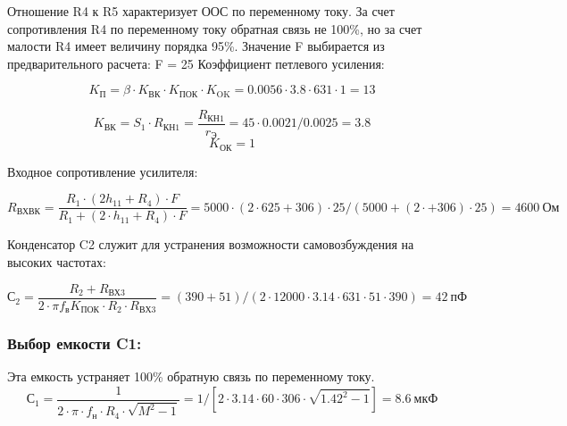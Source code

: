 Отношение R4  к R5 характеризует ООС по переменному току. За счет сопротивления R4 по переменному току обратная связь не 100\%, но за счет малости R4 имеет величину порядка 95\%.
Значение F выбирается из предварительного расчета: F = 25
Коэффициент петлевого усиления:

\begin{equation}
\label{eq:equation4_15}
K_{\text{П}}=\beta \cdot K_{\text{ВК}} \cdot K_{\text{ПОК}} \cdot K_{\text{OK}}=0.0056 \cdot 3.8 \cdot 631 \cdot 1 =13

\end{equation}

\begin{equation}
\label{eq:equation4_16}
K_{\text{ВК}}=S_1 \cdot R_{\text{КН1}}=\dfrac{R_{\text{КН1}}}{r_{\text{Э}}}=45 \cdot 0.0021/0.0025=3.8

\end{equation}
\begin{equation}
\label{eq:equation4_17}
K_{\text{ОК}}=1
\end{equation}

Входное сопротивление усилителя:

\begin{equation}
\label{eq:equation4_18}
R_{\text{ВХВК}}=\dfrac{R_1 \cdot (2 h_{11}+R_4) \cdot F}{R_1+(2 \cdot h_{11}+R_{\text{4}}) \cdot F} = 5000 \cdot(2 \cdot 625+306) \cdot 25 / (5000+(2 \cdot+306) \cdot 25)=4600~\text{Ом}
\end{equation}

Конденсатор C2 служит для устранения возможности самовозбуждения на высоких частотах:

\begin{equation}
\label{eq:equation4_19}
С_{\text{2}}=\dfrac{R_{\text{2}}+R_{\text{ВХ3}}}{2 \cdot \pi f_{\text{в}} K_{\text{ПОК}} \cdot R_2 \cdot R_{ВХ3} }=(390+51)
/(2 \cdot 12000 \cdot 3.14 \cdot 631 \cdot 51 \cdot 390)=42~\text{пФ}
\end{equation}

\subsubsection{Выбор емкости C1:}

Эта емкость устраняет 100\% обратную связь по переменному току.
\begin{equation}
\label{eq:equation4_20}
С_1=\dfrac{1}{2 \cdot \pi\cdot f_{\text{н}} \cdot R_4 \cdot \sqrt{M^2-1}}=1/[2 \cdot 3.14 \cdot 60 \cdot 306 \cdot \sqrt{1.42^2-1}]=8.6~\text{мкФ}
\end{equation}


